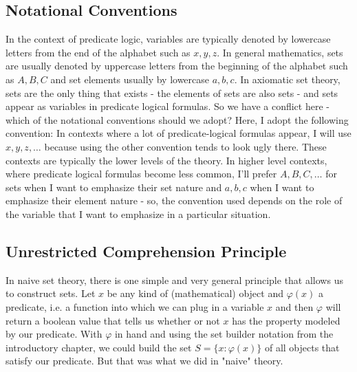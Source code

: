 
\subsection{Notational Conventions}  In the context of predicate logic, variables are typically denoted by lowercase letters from the end of the alphabet such as $x,y,z$. In general mathematics, sets are usually denoted by uppercase letters from the beginning of the alphabet such as $A,B,C$ and set elements usually by lowercase $a,b,c$. In axiomatic set theory, sets are the only thing that exists - the elements of sets are also sets - and sets appear as variables in predicate logical formulas. So we have a conflict here - which of the notational conventions should we adopt? Here, I adopt the following convention: In contexts where a lot of predicate-logical formulas appear, I will use $x,y,z, \ldots$ because using the other convention tends to look ugly there. These contexts are typically the lower levels of the theory. In higher level contexts, where predicate logical formulas become less common, I'll prefer  $A,B,C, \ldots$ for sets when I want to emphasize their set nature and $a,b,c$ when I want to emphasize their element nature - so, the convention used depends on the role of the variable that I want to emphasize in a particular situation.

\subsection{Unrestricted Comprehension Principle}
In naive set theory, there is one simple and very general principle that allows us to construct sets. Let $x$ be any kind of (mathematical) object and $\varphi(x)$ a predicate, i.e. a function into which we can plug in a variable $x$ and then $\varphi$ will return a boolean value that tells us whether or not $x$ has the property modeled by our predicate. With $\varphi$ in hand and using the set builder notation from the introductory chapter, we could build the set $S = \{x: \varphi(x)\}$ of all objects that satisfy our predicate. But that was what we did in "naive" theory.

